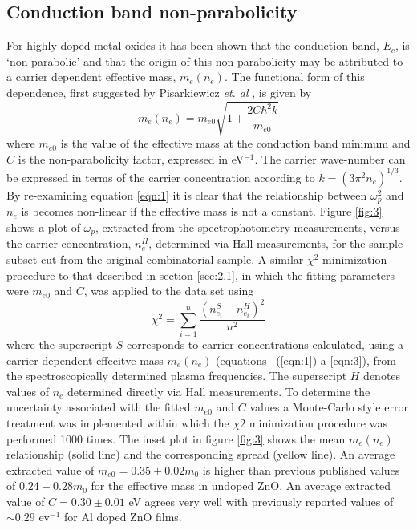 \documentclass[aps,prl,preprint,showpacs,showkeys,linenumbers]{revtex4-1}
\begin{document}
\subsection{ Conduction band non-parabolicity}
\label{sec:2.2}

For highly doped metal-oxides it has been shown that the conduction band, $E_c$, is `non-parabolic' and that the origin of this non-parabolicity may be attributed to a carrier dependent effective mass, $m_e(n_e)$. The functional form of this dependence, first suggested by Pisarkiewicz \textit{et. al} \cite{Pisarkiewicz1990}, is given by
\begin{equation}
\label{eqn:3}
m_e(n_e) = m_{e0}\sqrt{1+\frac{2C\hbar^2k}{m_{e0}}}
\end{equation}
where $m_{e0}$ is the value of the effective mass at the conduction band minimum and $C$ is the non-parabolicity factor, expressed in eV$^{-1}$. The carrier wave-number can be expressed in terms of the carrier concentration according to $k = (3\pi^2n_e)^{1/3}$. By re-examining equation \ref{eqn:1} it is clear that the relationship between $\omega_p^2$ and $n_e$ is becomes non-linear if the effective mass is not a constant. Figure \ref{fig:3} shows a plot of $\omega_{p}$, extracted from the spectrophotometry measurements, versus the carrier concentration, $n_e^H$, determined via Hall measurements, for the sample subset cut from the original combinatorial sample. A similar $\chi^2$ minimization procedure to that described in section \ref{sec:2.1}, in which the fitting parameters were $m_{e0}$ and $C$, was applied to the data set using
\begin{equation}\label{eqn:4}
\chi^2 = \sum_{i=1}^n\frac{(n_{e_i}^S-n_{e_i}^H)^2}{n^2}
\end{equation}
where the superscript $S$ corresponds to carrier concentrations calculated, using a carrier dependent effecitve mass $m_e(n_e)$ (equations ~(\ref{eqn:1}) a \ref{eqn:3}), from the spectroscopically determined plasma frequencies. The superscript $H$ denotes values of $n_e$ determined directly via Hall measurements. To determine the uncertainty associated with the fitted $m_{e0}$ and $C$ values a Monte-Carlo style error treatment \cite{Mendelsberg2009} was implemented within which the $\chi2$ minimization procedure was performed 1000 times. The inset plot in figure \ref{fig:3} shows the mean $m_e(n_e)$ relationship (solid line) and the corresponding spread (yellow line). An average extracted value of $m_{e0} = 0.35\pm0.02m_0$ is higher than previous published values of $0.24 - 0.28 m_0$ for the effective mass in undoped ZnO. An average extracted value of $C=0.30\pm0.01$ eV agrees very well with previously reported values of $\sim0.29$ ev$^{-1}$ \cite{Ruske2009, Ellmer2001} for Al doped ZnO films.
\end{document}
